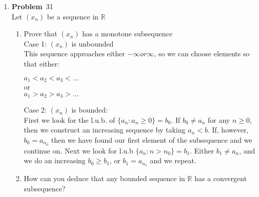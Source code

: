 \documentclass[12pt]{amsart}
\newcommand{\benu}{\begin{enumerate}}
\newcommand{\eenu}{\end{enumerate}}
\theoremstyle{definition}
\newcommand{\mbR}{\mathbb{R}}
\newcommand{\itep}{\item {\bfseries Problem}\ }
\begin{document}
\begin{enumerate}[series=p]
\newpage

\itep 31\\
Let $(x_n)$ be a sequence in $\mbR$
\benu
\item Prove that $(x_n)$ has a monotone subsequence\\
Case 1: $(x_n)$ is unbounded\\
This sequence approaches either $-\infty or \infty$, so we can choose elements so that either:
\begin{center}
	$a_1 < a_2 < a_3 < \dots$
	\\
	or
	\\
	$a_1 > a_2 > a_3 > \dots$
\end{center}
Case 2: $(x_n)$ is bounded:\\
First we look for the l.u.b. of $\{a_n: a_n \geq 0\} = b_0$.  If $b_0 \neq a_n$ for any $n \geq 0$, then we construct an increasing sequence by taking $a_n < b$.  If, however, $b_0 = a_{n_0}$ then we have found our first element of the subsequence and we continue on.  Next we look for l.u.b $\{a_n: n>n_0\} = b_1$.  Either $b_1 \neq a_n$, and we do an increasing $b_0 \geq b_1$, or $b_1 = a_{n_1}$ and we repeat.
\item How can you deduce that any bounded sequence in $\mbR$ has a convergent subsequence?
\eenu

\end{enumerate}
\end{document}
